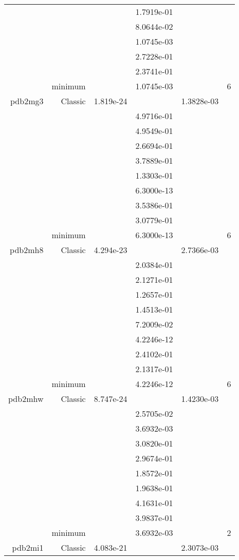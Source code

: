 \begin{xltabular}{\textwidth}{r|rS[table-format=1.3e+2]S[table-format=1.4e+2]S[table-format=1.4e+2]S[table-format=-1.5]}
&  &  & 1.7919e-01 & & \\
&  &  & 8.0644e-02 & & \\
&  &  & 1.0745e-03 & & \\
&  &  & 2.7228e-01 & & \\
&  &  & 2.3741e-01 & & \\
& minimum &  & 1.0745e-03 & & 6 \\  \addlinespace
pdb2mg3 & Classic & 1.819e-24 &  & 1.3828e-03 & \\
&  &  & 4.9716e-01 & & \\
&  &  & 4.9549e-01 & & \\
&  &  & 2.6694e-01 & & \\
&  &  & 3.7889e-01 & & \\
&  &  & 1.3303e-01 & & \\
&  &  & 6.3000e-13 & & \\
&  &  & 3.5386e-01 & & \\
&  &  & 3.0779e-01 & & \\
& minimum &  & 6.3000e-13 & & 6 \\  \addlinespace
pdb2mh8 & Classic & 4.294e-23 &  & 2.7366e-03 & \\
&  &  & 2.0384e-01 & & \\
&  &  & 2.1271e-01 & & \\
&  &  & 1.2657e-01 & & \\
&  &  & 1.4513e-01 & & \\
&  &  & 7.2009e-02 & & \\
&  &  & 4.2246e-12 & & \\
&  &  & 2.4102e-01 & & \\
&  &  & 2.1317e-01 & & \\
& minimum &  & 4.2246e-12 & & 6 \\  \addlinespace
pdb2mhw & Classic & 8.747e-24 &  & 1.4230e-03 & \\
&  &  & 2.5705e-02 & & \\
&  &  & 3.6932e-03 & & \\
&  &  & 3.0820e-01 & & \\
&  &  & 2.9674e-01 & & \\
&  &  & 1.8572e-01 & & \\
&  &  & 1.9638e-01 & & \\
&  &  & 4.1631e-01 & & \\
&  &  & 3.9837e-01 & & \\
& minimum &  & 3.6932e-03 & & 2 \\  \addlinespace
pdb2mi1 & Classic & 4.083e-21 &  & 2.3073e-03 & \\

\end{xltabular}
